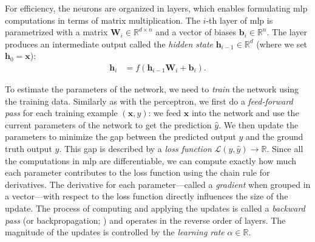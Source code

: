 For efficiency, the neurons are organized in layers, which enables formulating \ac{mlp} computations in terms of matrix multiplication. The $i$-th layer of \ac{mlp} is parametrized with a matrix $\mathbf{W}_i \in \mathbb{R}^{d\times n}$ and a vector of biases $\mathbf{b}_i \in \mathbb{R}^{n}$. The layer produces an intermediate output called the \textit{hidden state} $\mathbf{h}_{i-1} \in \mathbb{R}^{d}$ (where we set $\textbf{h}_0 = \textbf{x}$):
\begin{align}
    \mathbf{h}_i & = f(\mathbf{h}_{i-1} \mathbf{W}_i + \mathbf{b}_i).
\end{align}

To estimate the parameters of the network, we need to \emph{train} the network using the training data. Similarly as with the perceptron, we first do a \emph{feed-forward pass} for each training example $(\mathbf{x}, y)$: we feed $\mathbf{x}$ into the network and use the current parameters of the network to get the prediction $\hat{y}$. We then update the parameters to minimize the gap between the predicted output $\hat{y}$ and the ground truth output $y$. This gap is described by a \textit{loss function} $\mathcal{L}(y, \hat{y}) \rightarrow \mathbb{R}$.
Since all the computations in \ac{mlp} are differentiable, we can compute exactly how much each parameter contributes to the loss function using the chain rule for derivatives. The derivative for each parameter---called a \emph{gradient} when grouped in a vector---with respect to the loss function directly influences the size of the update. The process of computing and applying the updates is called a \emph{backward pass} (or backpropagation; \citealp{kelley1960gradient,rumelhart1986learning}) and operates in the reverse order of layers. The magnitude of the updates is controlled by the \emph{learning rate} $\alpha \in \mathbb{R}$.

